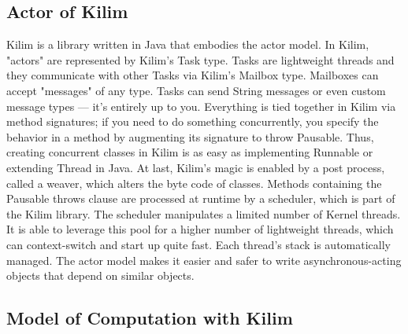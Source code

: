 \documentclass[twocolumn,a4paper,10pt]{article}
\begin{document}
\subsection{Actor of Kilim}
Kilim is a library written in Java that embodies the actor model. In Kilim, "actors" are represented by Kilim's Task type. Tasks are lightweight threads and they communicate with other Tasks via Kilim's Mailbox type. Mailboxes can accept "messages" of any type. Tasks can send String messages or even custom message types — it's entirely up to you. Everything is tied together in Kilim via method signatures; if you need to do something concurrently, you specify the behavior in a method by augmenting its signature to throw Pausable. Thus, creating concurrent classes in Kilim is as easy as implementing Runnable or extending Thread in Java. At last, Kilim's magic is enabled by a post process, called a weaver, which alters the byte code of classes. Methods containing the Pausable throws clause are processed at runtime by a scheduler, which is part of the Kilim library. The scheduler manipulates a limited number of Kernel threads. It is able to leverage this pool for a higher number of lightweight threads, which can context-switch and start up quite fast. Each thread's stack is automatically managed. The actor model makes it easier and safer to write asynchronous-acting objects that depend on similar objects.

\subsection{Model of Computation with Kilim}
\end{document}
